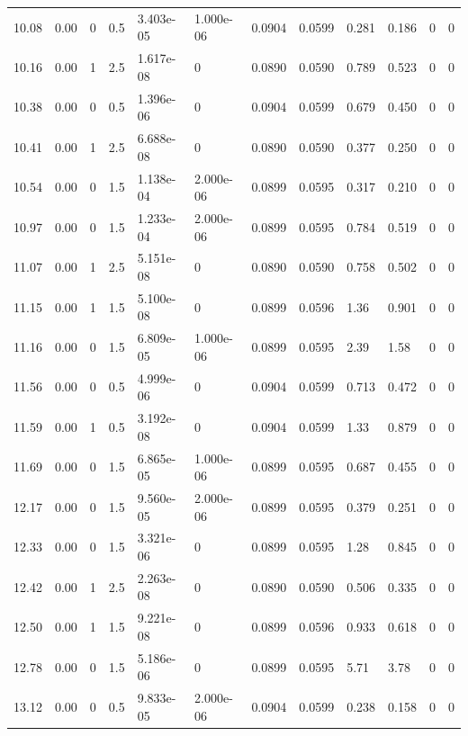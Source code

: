 \documentclass[preview]{standalone}
\begin{document}
{{{\begin{tabular}{L{1.2cm}C{1.2cm} C{0.3cm}C{0.5cm} C{1.4cm}C{1.4cm} C{1.4cm}C{1.4cm} C{1.6cm}C{1.6cm} C{1.6cm}C{1.6cm}}
  10.08  &  0.00  & 0     & 0.5 &  3.403e-05  & 1.000e-06  &  0.0904&   0.0599& 0.281 & 0.186   &  0 & 0  \\ 
  10.16  &  0.00  & 1     & 2.5 &  1.617e-08  & 0  &  0.0890&   0.0590& 0.789 & 0.523   &  0 & 0  \\ 
  10.38  &  0.00  & 0     & 0.5 &  1.396e-06  & 0  &  0.0904&   0.0599& 0.679 & 0.450   &  0 & 0  \\ 
  10.41  &  0.00  & 1     & 2.5 &  6.688e-08  & 0  &  0.0890&   0.0590& 0.377 & 0.250   &  0 & 0  \\ 
  10.54  &  0.00  & 0     & 1.5 &  1.138e-04  & 2.000e-06  &  0.0899&   0.0595& 0.317 & 0.210   &  0 & 0  \\ 
  10.97  &  0.00  & 0     & 1.5 &  1.233e-04  & 2.000e-06  &  0.0899&   0.0595& 0.784 & 0.519   &  0 & 0  \\ 
  11.07  &  0.00  & 1     & 2.5 &  5.151e-08  & 0  &  0.0890&   0.0590& 0.758 & 0.502   &  0 & 0  \\ 
  11.15  &  0.00  & 1     & 1.5 &  5.100e-08  & 0  &  0.0899&   0.0596& 1.36 & 0.901   &  0 & 0  \\ 
  11.16  &  0.00  & 0     & 1.5 &  6.809e-05  & 1.000e-06  &  0.0899&   0.0595& 2.39 & 1.58   &  0 & 0  \\ 
  11.56  &  0.00  & 0     & 0.5 &  4.999e-06  & 0  &  0.0904&   0.0599& 0.713 & 0.472   &  0 & 0  \\ 
  11.59  &  0.00  & 1     & 0.5 &  3.192e-08  & 0  &  0.0904&   0.0599& 1.33 & 0.879   &  0 & 0  \\ 
  11.69  &  0.00  & 0     & 1.5 &  6.865e-05  & 1.000e-06  &  0.0899&   0.0595& 0.687 & 0.455   &  0 & 0  \\ 
  12.17  &  0.00  & 0     & 1.5 &  9.560e-05  & 2.000e-06  &  0.0899&   0.0595& 0.379 & 0.251   &  0 & 0  \\ 
  12.33  &  0.00  & 0     & 1.5 &  3.321e-06  & 0  &  0.0899&   0.0595& 1.28 & 0.845   &  0 & 0  \\ 
  12.42  &  0.00  & 1     & 2.5 &  2.263e-08  & 0  &  0.0890&   0.0590& 0.506 & 0.335   &  0 & 0  \\ 
  12.50  &  0.00  & 1     & 1.5 &  9.221e-08  & 0  &  0.0899&   0.0596& 0.933 & 0.618   &  0 & 0  \\ 
  12.78  &  0.00  & 0     & 1.5 &  5.186e-06  & 0  &  0.0899&   0.0595& 5.71 & 3.78   &  0 & 0  \\ 
  13.12  &  0.00  & 0     & 0.5 &  9.833e-05  & 2.000e-06  &  0.0904&   0.0599& 0.238 & 0.158   &  0 & 0  \\ 

\end{tabular}}}}
\end{document}
